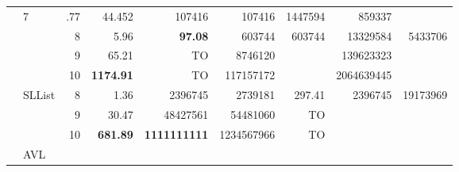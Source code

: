 \begin{table}[H]
\begin{center}
\begin{tabular}{clr|rr|rr|rr}
    &   7   & .77	& 44.452 & 107416 & 107416 & 1447594 & 859337 \\
&   &	8	&	5.96	& \textbf{97.08} &	603744	& 603744 & 13329584	&	5433706	\\
&	&	9	&	65.21	& TO &	8746120	& &	139623323	&		\\
&	&	10	&	\textbf{1174.91}	& TO &	117157172 &	&	2064639445	&		\\
\cmidrule{2-9}
 &SLList 
	&	8	&	1.36	&	2396745	&	2739181	&	297.41	&	2396745	&	19173969	\\
&	&	9	&	30.47	&	48427561	&	54481060	&	TO	&		&		\\
&	&	10	&	\textbf{681.89}	&	\textbf{1111111111}	&	1234567966	&	TO	&		&		\\
\cmidrule{2-9}
&	AVL


\end{tabular}
\end{center}
\end{table}
